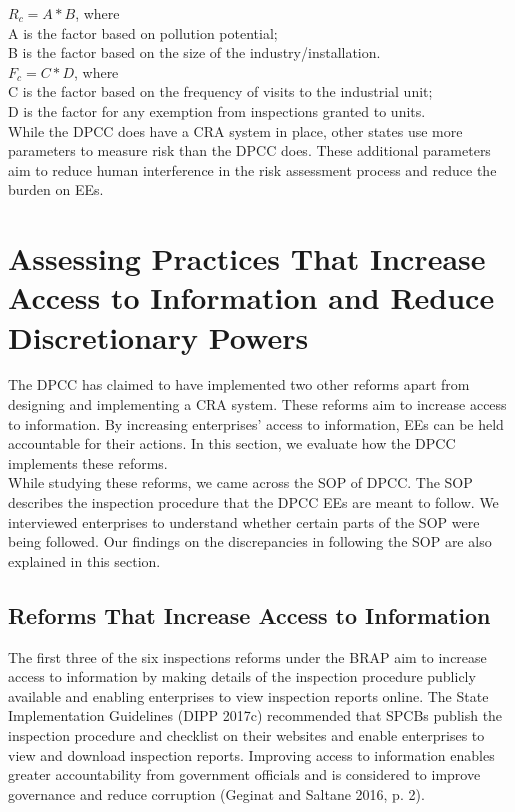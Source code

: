 \documentclass[a4paper, 12pt]{article}
\begin{document}
	$R_c = A*B$, where \\
	
	A is the factor based on pollution potential; \\
	
	B is the factor based on the size of the industry/installation. \\
	
	$F_c = C*D$, where \\
	
	C is the factor based on the frequency of visits to the industrial unit; \\
	
	D is the factor for any exemption from inspections granted to units. \\
	
	While the DPCC does have a CRA system in place, other states use more parameters to measure risk than the DPCC does. These additional parameters aim to reduce human interference in the risk assessment process and reduce the burden on EEs. \\
	
	\section{Assessing Practices That Increase Access to Information and Reduce Discretionary Powers}
	
	The DPCC has claimed to have implemented two other reforms apart from designing and implementing a CRA system. These reforms aim to increase access to information. By increasing enterprises’ access to information, EEs can be held accountable for their actions. In this section, we evaluate how the DPCC implements these reforms. \\
	
	While studying these reforms, we came across the SOP of DPCC. The SOP describes the inspection procedure that the DPCC EEs are meant to follow. We interviewed enterprises to understand whether certain parts of the SOP were being followed. Our findings on the discrepancies in following the SOP are also explained in this section. \\
	
	\subsection{Reforms That Increase Access to Information}
	
	The first three of the six inspections reforms under the BRAP aim to increase access to information by making details of the inspection procedure publicly available and enabling enterprises to view inspection reports online. The State Implementation Guidelines (DIPP 2017c) recommended that SPCBs publish the inspection procedure and checklist on their websites and enable enterprises to view and download inspection reports. Improving access to information enables greater accountability from government officials and is considered to improve governance and reduce corruption (Geginat and Saltane 2016, p. 2). \\
	
\end{document}
